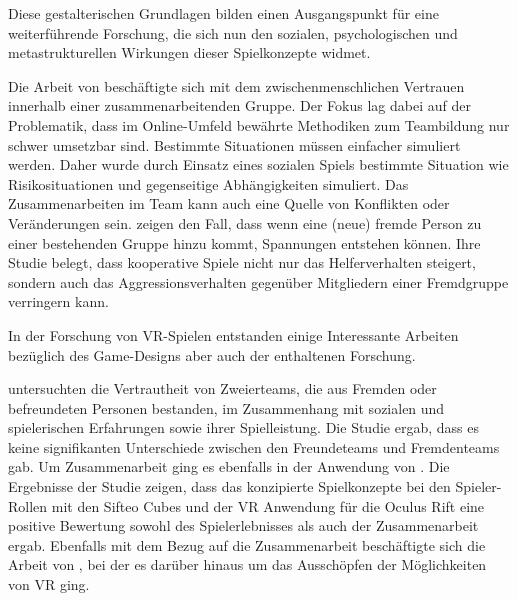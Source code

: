 Diese gestalterischen Grundlagen bilden einen Ausgangspunkt für eine weiterführende Forschung, die sich nun den sozialen, psychologischen und metastrukturellen Wirkungen dieser Spielkonzepte widmet.

Die Arbeit von \cite{depping_trust_2016} beschäftigte sich mit dem zwischenmenschlichen Vertrauen innerhalb einer zusammenarbeitenden Gruppe. Der Fokus lag dabei auf der Problematik, dass im Online-Umfeld bewährte Methodiken zum Teambildung nur schwer umsetzbar sind. Bestimmte Situationen müssen einfacher simuliert werden. Daher wurde durch Einsatz eines sozialen Spiels bestimmte Situation wie Risikosituationen und gegenseitige Abhängigkeiten simuliert. Das Zusammenarbeiten im Team kann auch eine Quelle von Konflikten oder Veränderungen sein. \cite{velez_ingroup_2014} zeigen den Fall, dass wenn eine (neue) fremde Person zu einer bestehenden Gruppe hinzu kommt, Spannungen entstehen können. Ihre Studie belegt,  dass kooperative Spiele nicht nur das Helferverhalten steigert, sondern auch das Aggressionsverhalten gegenüber Mitgliedern einer Fremdgruppe verringern kann.

In der Forschung von \ac{VR}-Spielen entstanden einige Interessante Arbeiten bezüglich des Game-Designs aber auch der enthaltenen Forschung.

\cite{karaosmanoglu_playing_2023} untersuchten die Vertrautheit von Zweierteams, die aus Fremden oder befreundeten Personen bestanden, im Zusammenhang mit sozialen und spielerischen Erfahrungen sowie ihrer Spielleistung. Die Studie ergab, dass es keine signifikanten Unterschiede zwischen den Freundeteams und Fremdenteams gab. Um Zusammenarbeit ging es ebenfalls in der Anwendung von \cite{sajjadi_maze_2014}. Die Ergebnisse der Studie zeigen, dass das konzipierte Spielkonzepte bei den Spieler-Rollen mit den Sifteo Cubes und der VR Anwendung für die Oculus Rift eine positive Bewertung sowohl des Spielerlebnisses als auch der Zusammenarbeit ergab. Ebenfalls mit dem Bezug auf die Zusammenarbeit beschäftigte sich die Arbeit von \cite{smilovitch_birdquestvr_2019}, bei der es darüber hinaus um das Ausschöpfen der Möglichkeiten von \ac{VR} ging.

